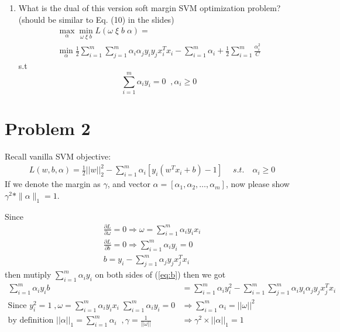 \documentclass[11pt]{article}
\begin{document}
\begin{enumerate}
	\item What is the dual of this version soft margin SVM optimization problem? (should be similar to Eq. (10) in the slides)
		\begin{align}
				\max_{\alpha}\min_{\omega\;\xi\;b}L(\omega\;\xi\;b\;\alpha) = \\
				\min_{\alpha} \frac{1}{2}\sum_{i=1}^{m}\sum_{j=1}^{m}\alpha_i\alpha_jy_iy_jx_i^T x_i-\sum_{i=1}^{m}\alpha_i+\frac{1}{2}\sum_{i=1}^{m}\frac{\alpha_i^2}{C} \label{eq:newsoft}
		\end{align}
		s.t
		$$\sum_{i=1}^{m}\alpha_iy_i=0\;\;, \alpha_i\geq 0$$
\end{enumerate}

\section*{Problem 2}
Recall vanilla SVM objective:
\begin{equation}
\begin{aligned}
L(w,b,\alpha) = \frac{1}{2}||w||_2^2 - \sum\limits_{i=1}^{m}\alpha_i[y_i(w^Tx_i + b) - 1] \; \quad s.t. \quad \alpha_i \geq 0
\end{aligned}
\end{equation}
If we denote the margin as $\gamma$, and vector $\alpha=[\alpha_1, \alpha_2, \dots, \alpha_m]$, now please show $\gamma^2*\|\alpha\|_1=1$.


Since
\begin{align}
	\frac{\partial L}{\partial \omega} =0 \Rightarrow \omega = \sum_{i=1}^{m}\alpha_iy_ix_i\\
	\frac{\partial L}{\partial b} =0 \Rightarrow \sum_{i=1}^{m}\alpha_iy_i=0\\
	b = y_i-\sum_{j=1}^{m}\alpha_jy_jx_j^Tx_i \label{eq:b}
\end{align}
then mutiply $\sum_{i=1}^{m}\alpha_iy_i$ on both sides of (\ref{eq:b})
then we got
\begin{align}
	\sum_{i=1}^{m}\alpha_iy_ib &= \sum_{i=1}^{m}\alpha_iy_i^2-\sum_{i=1}^{m}\sum_{j=1}^{m}\alpha_iy_i\alpha_jy_jx_j^Tx_i\\
	\text{Since } y_i^2=1\; ,\omega = \sum_{i=1}^{m}\alpha_iy_ix_i \;  \sum_{i=1}^{m}\alpha_iy_i=0&\Rightarrow \sum_{i=1}^{m}\alpha_i = ||\omega||^2\\
	\text{by definition } ||\alpha||_1 = \sum_{i=1}^{m}\alpha_i \;\; , \gamma = \frac{1}{||\omega||} &\Rightarrow \gamma^2\times ||\alpha||_1 = 1
\end{align}
\end{document}
